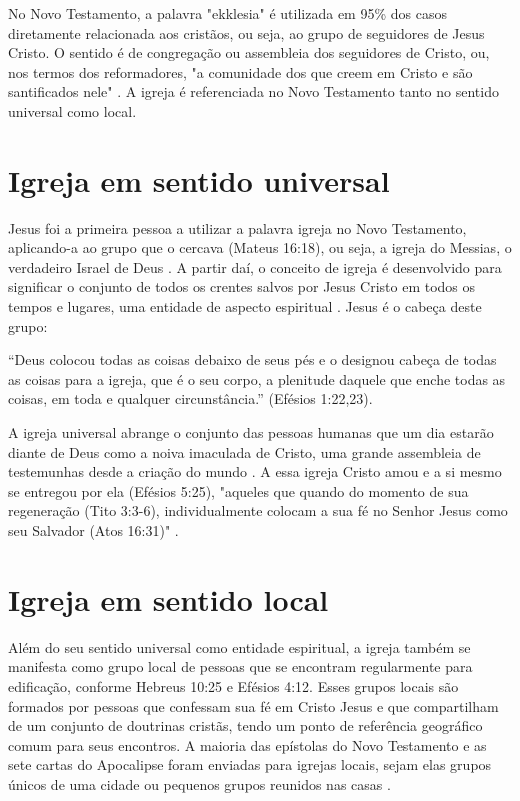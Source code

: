 \documentclass[12pt,openright,oneside,a4paper,
english,french,spanish,brazil]{abntex2}
\begin{document}
No Novo Testamento, a palavra "ekklesia" é utilizada em 95\% dos casos diretamente relacionada aos cristãos, ou seja, ao grupo de seguidores de Jesus Cristo. O sentido é de congregação ou assembleia dos seguidores de Cristo, ou, nos termos dos reformadores, "a comunidade dos que creem em Cristo e são santificados nele" \cite[p. 318]{zac}. A igreja é referenciada no Novo Testamento tanto no sentido universal como local\cite[p. 318]{zac}.

\section{Igreja em sentido universal}

Jesus foi a primeira pessoa a utilizar a palavra igreja no Novo Testamento, aplicando-a ao grupo que o cercava (Mateus 16:18), ou seja, a igreja do Messias, o verdadeiro Israel de Deus \cite[p. 911]{berkhof}. A partir daí, o conceito de igreja é desenvolvido para significar o conjunto de todos os crentes salvos por Jesus Cristo em todos os tempos e lugares, uma entidade de aspecto espiritual \cite[p. 318]{zac}. Jesus é o cabeça deste grupo:

\begin{citacao}“Deus colocou todas as coisas debaixo de seus pés e o designou cabeça de todas as coisas para a igreja, que é o seu corpo, a plenitude daquele que enche todas as coisas, em toda e qualquer circunstância.” (Efésios 1:22,23).
\end{citacao}

A igreja universal abrange o conjunto das pessoas humanas que um dia estarão diante de Deus como a noiva imaculada de Cristo, uma grande assembleia de testemunhas desde a criação do mundo \cite[p. 607]{bavinck}. A essa igreja Cristo amou e a si mesmo se entregou por ela (Efésios 5:25), "aqueles que quando do momento de sua regeneração (Tito 3:3-6), individualmente colocam a sua fé no Senhor Jesus como seu Salvador (Atos 16:31)" \cite[p. 319]{zac}.

\section{Igreja em sentido local}

Além do seu sentido universal como entidade espiritual, a igreja também se manifesta como grupo local de pessoas que se encontram regularmente para edificação, conforme Hebreus 10:25 e Efésios 4:12. Esses grupos locais são formados por pessoas que confessam sua fé em Cristo Jesus e que compartilham de um conjunto de doutrinas cristãs, tendo um ponto de referência geográfico comum para seus encontros. A maioria das epístolas do Novo Testamento e as sete cartas do Apocalipse foram enviadas para igrejas locais, sejam elas grupos únicos de uma cidade ou pequenos grupos reunidos nas casas \cite[p. 320]{zac}. 
\end{document}
